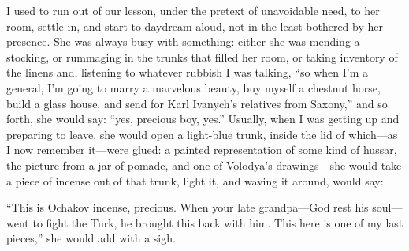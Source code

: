 I used to run out of our lesson, under the pretext of unavoidable need, to her room, settle in, and start to daydream aloud, not in the least bothered by her presence. She was always busy with something: either she was mending a stocking, or rummaging in the trunks that filled her room, or taking inventory of the linens and, listening to whatever rubbish I was talking, ``so when I'm a general, I'm going to marry a marvelous beauty, buy myself a chestnut horse, build a glass house, and send for Karl Ivanych's relatives from Saxony,'' and so forth, she would say: ``yes, precious boy, yes.'' Usually, when I was getting up and preparing to leave, she would open a light-blue trunk, inside the lid of which---as I now remember it---were glued: a painted representation of some kind of hussar, the picture from a jar of pomade, and one of Volodya's drawings---she would take a piece of incense out of that trunk, light it, and waving it around, would say:

``This is Ochakov incense, precious. When your late grandpa---God rest his soul---went to fight the Turk, he brought this back with him. This here is one of my last pieces,'' she would add with a sigh. %

